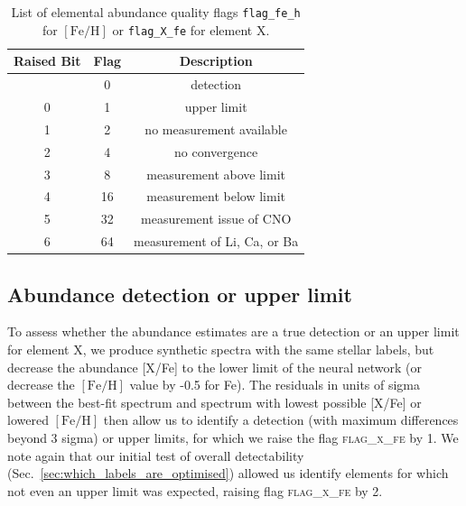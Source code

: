 \documentclass[
  journal=pasa,
  manuscript=research-paper, %
  year=2023,
  volume=37
]{cup-journal}
\newcommand{\feh}{$\mathrm{[Fe/H]}$\xspace}
\begin{document}
\begin{table}
\centering
\caption{List of elemental abundance quality flags \texttt{flag\_fe\_h} for \feh or \texttt{flag\_X\_fe} for element X.}
\label{tab:flag_x_fe}
\begin{tabular}{ccc}
\hline \hline
Raised Bit & Flag & Description \\
\hline
  & 0 & detection \\ 
0 & 1 & upper limit \\ 
1 & 2 & no measurement available\\
2 & 4 & no convergence\\
3 & 8 & measurement above limit\\
4 & 16 & measurement below limit\\
5 & 32 & measurement issue of CNO \\
6 & 64 & measurement of Li, Ca, or Ba \\ %
\hline
\end{tabular}
\end{table}

\subsection{Abundance detection or upper limit}
\label{sec:abundance_detection_or_upper_limit}

To assess whether the abundance estimates are a true detection or an upper limit for element X, we produce synthetic spectra with the same stellar labels, but decrease the abundance [X/Fe] to the lower limit of the neural network (or decrease the \feh value by -0.5 for Fe). The residuals in units of sigma between the best-fit spectrum and spectrum with lowest possible [X/Fe] or lowered \feh then allow us to identify a detection (with maximum differences beyond 3 sigma) or upper limits, for which we raise the flag \textsc{flag\_x\_fe} by 1. We note again that our initial test of overall detectability (Sec.~\ref{sec:which_labels_are_optimised}) allowed us identify elements for which not even an upper limit was expected, raising flag \textsc{flag\_x\_fe} by 2.
\end{document}
